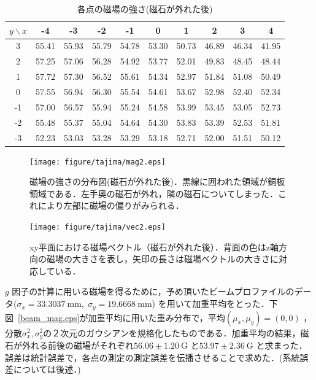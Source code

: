 \begin{table}[H]
\centering
\caption{各点の磁場の強さ(磁石が外れた後)}\label{MF2}
\begin{tabular}{|c||c|c|c|c|c|c|c|c|c|}\hline
$y \backslash x$ & -4 & -3 & -2 & -1 & 0 & 1 & 2 & 3 & 4 \\ \hline \hline
3 & 55.41 & 55.93 & 55.79 & 54.78 & 53.30 & 50.73 & 46.89 & 46.34 & 41.95 \\ \hline
2 & 57.25 & 57.06 & 56.28 & 54.92 & 53.77 & 52.01 & 49.83 & 48.45 & 48.44 \\ \hline
1 & 57.72 & 57.30 & 56.52 & 55.61 & 54.34 & 52.97 & 51.84 & 51.08 & 50.49 \\ \hline
0 & 57.55 & 56.94 & 56.30 & 55.54 & 54.61 & 53.67 & 52.98 & 52.40 & 52.34 \\ \hline
-1 & 57.00 & 56.57 & 55.94 & 55.24 & 54.58 & 53.99 & 53.45 & 53.05 & 52.73 \\ \hline
-2 & 55.48 & 55.37 & 55.04 & 54.64 & 54.30 & 53.83 & 53.39 & 52.53 & 51.81 \\ \hline
-3 & 52.23 & 53.03 & 53.28 & 53.29 & 53.18 & 52.71 & 52.00 & 51.51 & 50.12 \\ \hline
\end{tabular}
\end{table}
\begin{figure}[H]
\begin{minipage}{0.45\hsize}
\centering
\texttt{[image: figure/tajima/mag2.eps]}
\caption{磁場の強さの分布図(磁石が外れた後)．黒線に囲われた領域が銅板領域である．左手奥の磁石が外れ，隣の磁石についてしまった．これにより左部に磁場の偏りがみられる．}
\label{mag2}
\end{minipage}
\begin{minipage}{0.45\hsize}
\centering
\texttt{[image: figure/tajima/vec2.eps]}
\caption{xy平面における磁場ベクトル（磁石が外れた後）．背面の色はz軸方向の磁場の大きさを表し，矢印の長さは磁場ベクトルの大きさに対応している．}
\label{vec2}
\end{minipage}
\end{figure}

$g$ 因子の計算に用いる磁場を得るために，予め頂いたビームプロファイルのデータ($\sigma_x = 33.3037~\mathrm{mm}, \; \sigma_y = 19.6668~\mathrm{mm}$) を用いて加重平均をとった．下図~\ref{beam_mag.eps}が加重平均に用いた重み分布で，平均$(\mu_x,\mu_y)=(0,0)$ ，分散$\sigma_x^2, \sigma_y^2$の２次元のガウシアンを規格化したものである．加重平均の結果，磁石が外れる前後の磁場がそれぞれ$56.06 \pm 1.20~\mathrm{G}$ と$53.97\pm 2.36~\mathrm{G}$ と求まった．誤差は統計誤差で，各点の測定の測定誤差を伝播させることで求めた．(系統誤差については後述．)

